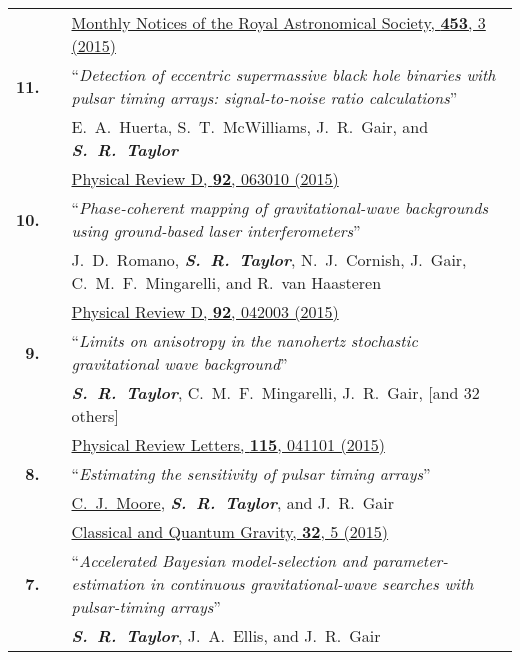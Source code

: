 \documentclass[11pt,letterpaper,sans]{moderncv}
\begin{document}
{\begin{longtable}{rp{0.3cm}p{15.8cm}}
&& \href{http://mnras.oxfordjournals.org/content/453/3/2576}{{\color{color1} Monthly Notices of the Royal Astronomical Society, \textbf{453}, 3 (2015)}} \vspace{0.09cm}\\
\textbf{11.} & & ``\textit{Detection of eccentric supermassive black hole binaries with pulsar timing arrays: signal-to-noise ratio calculations}'' \\ 
&& E.~A.~Huerta, S.~T.~McWilliams, J.~R.~Gair, and \textit{\textbf{S.~R.~Taylor}} \\ 
&& \href{http://journals.aps.org/prd/abstract/10.1103/PhysRevD.92.063010}{{\color{color1} Physical Review D, \textbf{92}, 063010 (2015)}} \vspace{0.09cm}\\
\textbf{10.} & & ``\textit{Phase-coherent mapping of gravitational-wave backgrounds using ground-based laser interferometers}'' \\ 
&& J.~D.~Romano, \textit{\textbf{S.~R.~Taylor}}, N.~J.~Cornish, J.~Gair, C.~M.~F.~Mingarelli, and R.~van Haasteren \\ 
&& \href{http://journals.aps.org/prd/abstract/10.1103/PhysRevD.92.042003}{{\color{color1} Physical Review D, \textbf{92}, 042003 (2015)}} \vspace{0.09cm}\\
\textbf{9.} & & ``\textit{Limits on anisotropy in the nanohertz stochastic gravitational wave background}'' \\ 
&& \textit{\textbf{S.~R.~Taylor}}, C.~M.~F.~Mingarelli, J.~R.~Gair, [and 32 others] \\ 
&& \href{http://journals.aps.org/prl/abstract/10.1103/PhysRevLett.115.041101}{{\color{color1} Physical Review Letters, \textbf{115}, 041101 (2015)}} \vspace{0.09cm}\\
\textbf{8.} & & ``\textit{Estimating the sensitivity of pulsar timing arrays}'' \\ 
&& \underline{C.~J.~Moore}, \textit{\textbf{S.~R.~Taylor}}, and J.~R.~Gair \\ 
&& \href{http://iopscience.iop.org/article/10.1088/0264-9381/32/5/055004/meta}{{\color{color1} Classical and Quantum Gravity, \textbf{32}, 5 (2015)}} \vspace{0.09cm}\\
\textbf{7.} & & ``\textit{Accelerated Bayesian model-selection and parameter-estimation in continuous gravitational-wave searches with pulsar-timing arrays}'' \\ 
&& \textit{\textbf{S.~R.~Taylor}}, J.~A.~Ellis, and J.~R.~Gair \\ 

\end{longtable}}
\end{document}
